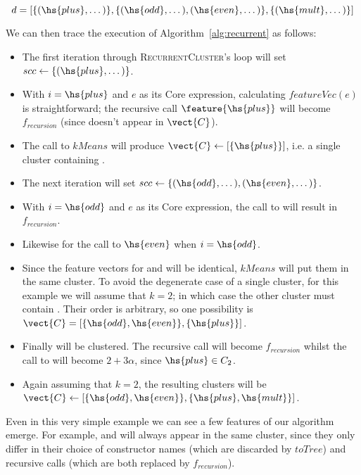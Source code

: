 \begin{equation}
  d = [\{(\hs{plus}, \dots)\},
       \{(\hs{odd}, \dots), (\hs{even}, \dots)\},
       \{(\hs{mult}, \dots)\}]
\end{equation}

We can then trace the execution of Algorithm~\ref{alg:recurrent} as follows:

\begin{itemize}
\item The first iteration through \textsc{RecurrentCluster}'s loop will set
  $scc \gets \{(\hs{plus}, \dots)\}$.
\item With $i = \hs{plus}$ and $e$ as its Core expression, calculating
  $featureVec(e)$ is straightforward; the recursive call $\feature{\hs{plus}}$
  will become $f_{recursion}$ (since  doesn't appear in $\vect{C}$).
\item The call to $kMeans$ will produce $\vect{C} \gets [\{\hs{plus}\}]$, i.e. a
  single cluster containing .
\item The next iteration will set
  $scc \gets \{(\hs{odd}, \dots), (\hs{even}, \dots)\}$.
\item With $i = \hs{odd}$ and $e$ as its Core expression, the call to 
  will result in $f_{recursion}$.
\item Likewise for the call to $\hs{even}$ when $i = \hs{odd}$.
\item Since the feature vectors for  and  will be identical,
  $kMeans$ will put them in the same cluster. To avoid the degenerate case of a
  single cluster, for this example we will assume that $k = 2$; in which case
  the other cluster must contain . Their order is arbitrary, so one
  possibility is $\vect{C} = [\{\hs{odd}, \hs{even}\}, \{\hs{plus}\}]$.
\item Finally  will be clustered. The recursive call will become
  $f_{recursion}$ whilst the call to  will become $2 + 3 \alpha$, since
  $\hs{plus} \in C_2$.
\item \begin{sloppypar}Again assuming that $k = 2$, the resulting clusters will
    be
    \mbox{$\vect{C} \gets [\{\hs{odd}, \hs{even}\}, \{\hs{plus},
      \hs{mult}\}]$}.\end{sloppypar}
\end{itemize}

Even in this very simple example we can see a few features of our algorithm
emerge. For example,  and  will always appear in the same
cluster, since they only differ in their choice of constructor names (which are
discarded by $toTree$) and recursive calls (which are both replaced by
$f_{recursion}$).

